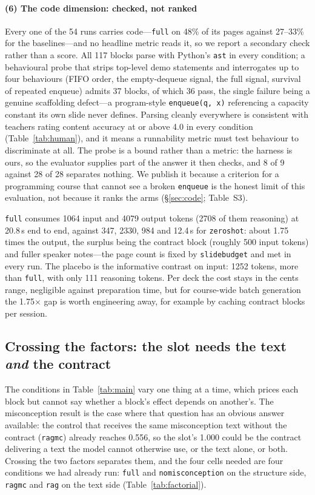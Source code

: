 \documentclass[review,12pt]{elsarticle}
\renewcommand{\_}{\kgunderscore\allowbreak}
\newcommand{\id}[1]{\texttt{#1}}
\begin{document}
\paragraph{(6) The code dimension: checked, not ranked} Every one of the 54 runs
carries code---\id{full} on 48\% of its pages against 27--33\% for the
baselines---and no headline metric reads it, so we report a secondary check
rather than a score. All 117 blocks parse with Python's \id{ast} in every
condition; a behavioural probe that strips top-level demo statements and
interrogates up to four behaviours (FIFO order, the empty-dequeue signal, the
full signal, survival of repeated enqueue) admits 37 blocks, of which 36 pass,
the single failure being a genuine scaffolding defect---a program-style
\id{enqueue(q, x)} referencing a capacity constant its own slide never defines.
Parsing cleanly everywhere is consistent with teachers rating content accuracy
at or above 4.0 in every condition (Table~\ref{tab:human}), and it means a
runnability metric must test behaviour to discriminate at all.
The probe is a bound rather than a metric: the harness is ours, so the evaluator
supplies part of the answer it then checks, and 8 of 9 against 28 of 28
separates nothing. We publish it because a criterion for a programming course
that cannot see a broken \id{enqueue} is the honest limit of this evaluation,
not because it ranks the arms (\S\ref{sec:code}; Table~S3).

\id{full} consumes 1064 input and 4079 output tokens (2708 of them reasoning)
at 20.8\,s end to end, against 347, 2330, 984 and 12.4\,s for \id{zero\_shot}:
about 1.75 times the output, the surplus being the contract block (roughly 500
input tokens) and fuller speaker notes---the page count is fixed by
\id{slide\_budget} and met in every run. The placebo is the informative
contrast on input: 1252 tokens, more than \id{full}, with only 111 reasoning
tokens. Per deck the cost stays in the cents range, negligible against
preparation time, but for course-wide batch generation the 1.75$\times$ gap is
worth engineering away, for example by caching contract blocks per session.

\subsection{Crossing the factors: the slot needs the text \emph{and} the contract}
\label{sec:factorial}

The conditions in Table~\ref{tab:main} vary one thing at a time, which prices
each block but cannot say whether a block's effect depends on another's. The
misconception result is the case where that question has an obvious answer
available: the control that receives the same misconception text without the
contract (\id{rag\_mc}) already reaches 0.556, so the slot's 1.000 could be the
contract delivering a text the model cannot otherwise use, or the text alone, or
both. Crossing the two factors separates them, and the four cells needed are four
conditions we had already run: \id{full} and \id{no\_misconception} on the
structure side, \id{rag\_mc} and \id{rag} on the text side
(Table~\ref{tab:factorial}).
\end{document}
